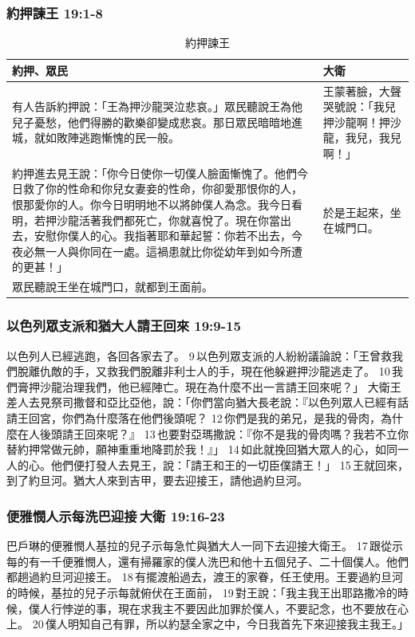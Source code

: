 \subsubsection{約押諫王 19:1-8}
\begin{table}[H]
\hspace*{-7mm}
\centering 
\begin{tabular}{p{14.05cm}|p{3.8cm}}\hline\hline
約押、眾民&大衛\\\hline
有人告訴約押說：「王為押沙龍哭泣悲哀。」眾民聽說王為他兒子憂愁，他們得勝的歡樂卻變成悲哀。那日眾民暗暗地進城，就如敗陣逃跑慚愧的民一般。
&王蒙著臉，大聲哭號說：「我兒押沙龍啊！押沙龍，我兒，我兒啊！」\\\hline
約押進去見王說：「你今日使你一切僕人臉面慚愧了。他們今日救了你的性命和你兒女妻妾的性命，你卻愛那恨你的人，恨那愛你的人。你今日明明地不以將帥僕人為念。我今日看明，若押沙龍活著我們都死亡，你就喜悅了。現在你當出去，安慰你僕人的心。我指著耶和華起誓：你若不出去，今夜必無一人與你同在一處。這禍患就比你從幼年到如今所遭的更甚！」&於是王起來，坐在城門口。\\\hline
眾民聽說王坐在城門口，就都到王面前。&\\\hline
\end{tabular}
\caption{約押諫王}
\end{table}

\subsubsection{以色列眾支派和猶大人請王回來 19:9-15}
以色列人已經逃跑，各回各家去了。 9 以色列眾支派的人紛紛議論說：「王曾救我們脫離仇敵的手，又救我們脫離非利士人的手，現在他躲避押沙龍逃走了。 10 我們膏押沙龍治理我們，他已經陣亡。現在為什麼不出一言請王回來呢？」
大衛王差人去見祭司撒督和亞比亞他，說：「你們當向猶大長老說：『以色列眾人已經有話請王回宮，你們為什麼落在他們後頭呢？ 12 你們是我的弟兄，是我的骨肉，為什麼在人後頭請王回來呢？』 13 也要對亞瑪撒說：『你不是我的骨肉嗎？我若不立你替約押常做元帥，願神重重地降罰於我！』」 14 如此就挽回猶大眾人的心，如同一人的心。他們便打發人去見王，說：「請王和王的一切臣僕請王！」 15 王就回來，到了約旦河。猶大人來到吉甲，要去迎接王，請他過約旦河。

\subsubsection{便雅憫人示每洗巴迎接 大衛 19:16-23}
巴戶琳的便雅憫人基拉的兒子示每急忙與猶大人一同下去迎接大衛王。 17 跟從示每的有一千便雅憫人，還有掃羅家的僕人洗巴和他十五個兒子、二十個僕人。他們都趟過約旦河迎接王。 18 有擺渡船過去，渡王的家眷，任王使用。王要過約旦河的時候，基拉的兒子示每就俯伏在王面前， 19 對王說：「我主我王出耶路撒冷的時候，僕人行悖逆的事，現在求我主不要因此加罪於僕人，不要記念，也不要放在心上。 20 僕人明知自己有罪，所以約瑟全家之中，今日我首先下來迎接我主我王。」

